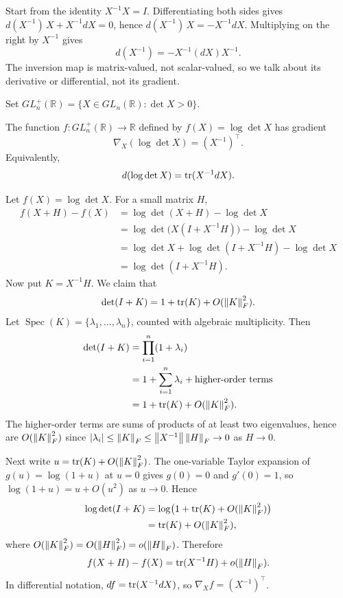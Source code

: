 \begin{pfbox}
Start from the identity $X^{-1}X=I$. Differentiating both sides gives
$d(X^{-1})\,X+X^{-1}dX=0$, hence $d(X^{-1})\,X=-X^{-1}dX$.
Multiplying on the right by $X^{-1}$ gives
\[
    d(X^{-1})=-X^{-1}(dX)X^{-1}.
\]
The inversion map is matrix-valued, not scalar-valued, so we talk about its derivative or differential, not its gradient.
\end{pfbox}

Set $GL_n^+(\mathbb{R})=\{X\in GL_n(\mathbb{R}):\det X>0\}$.

\begin{theorem}
The function $f:GL_n^+(\mathbb{R})\to\mathbb{R}$ defined by $f(X)=\log\det X$ has gradient
\[
    \nabla_X(\log\det X)=(X^{-1})^{\top}.
\]
Equivalently,
\[
    d(\log\det X)=\operatorname{tr}(X^{-1}dX).
\]
\end{theorem}

\begin{pfbox}
Let $f(X)=\log\det X$. For a small matrix $H$,
\[
\begin{aligned}
    f(X+H)-f(X)
    &=
    \log\det(X+H)-\log\det X\\
    &=
    \log\det\bigl(X(I+X^{-1}H)\bigr)-\log\det X\\
    &=
    \log\det X+
    \log\det(I+X^{-1}H)-\log\det X\\
    &=
    \log\det(I+X^{-1}H).
\end{aligned}
\]
Now put $K=X^{-1}H$. We claim that
\[
    \det(I+K)=1+\operatorname{tr}(K)+O(\left\lVert K \right\rVert_F^2).
\]
Let $\operatorname{Spec}(K)=\{\lambda_1,\ldots,\lambda_n\}$, counted
with algebraic multiplicity. Then
\[
\begin{aligned}
    \det(I+K)
    &=
    \prod_{i=1}^n(1+\lambda_i)                                  \\
    &=
    1+\sum_{i=1}^n\lambda_i+\text{higher-order terms}             \\
    &=
    1+\operatorname{tr}(K)+O(\left\lVert K \right\rVert_F^2).
\end{aligned}
\]
The higher-order terms are sums of products of at least two eigenvalues, hence
are $O(\left\lVert K \right\rVert_F^2)$ since $|\lambda_i|\le\left\lVert K \right\rVert_F\le\left\lVert X^{-1} \right\rVert\left\lVert H \right\rVert_F\to 0$ as $H\to 0$.

Next write $u=\operatorname{tr}(K)+O(\left\lVert K \right\rVert_F^2)$. The one-variable Taylor expansion of
$g(u)=\log(1+u)$ at $u=0$ gives $g(0)=0$ and $g'(0)=1$, so
$\log(1+u)=u+O(u^2)$ as $u\to0$. Hence
\[
\begin{aligned}
    \log\det(I+K)
    &=
    \log\bigl(1+\operatorname{tr}(K)+O(\left\lVert K \right\rVert_F^2)\bigr)\\
    &= 
    \operatorname{tr}(K)+O(\left\lVert K \right\rVert_F^2),
\end{aligned}
\]
where $O(\left\lVert K \right\rVert_F^2)=O(\left\lVert H \right\rVert_F^2)=o(\left\lVert H \right\rVert_F)$. Therefore
\[
    f(X+H)-f(X)
    =
    \operatorname{tr}(X^{-1}H)+o(\left\lVert H \right\rVert_F).
\]
In differential notation, $df=\operatorname{tr}(X^{-1}dX)$, so $\nabla_X f=(X^{-1})^{\top}$.
\end{pfbox}

